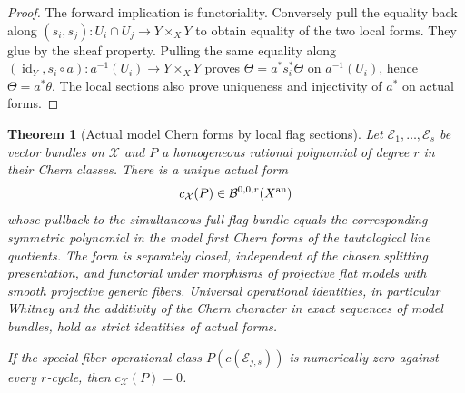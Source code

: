\documentclass[11pt]{article}
\newtheorem{theorem}{Theorem}[section]
\theoremstyle{definition}
\theoremstyle{remark}
\numberwithin{equation}{section}
\begin{document}
\begin{proof}
The forward implication is functoriality.  Conversely pull the equality
back along $(s_i,s_j):U_i\cap U_j\to Y\times_XY$ to obtain equality
of the two local forms.  They glue by the sheaf property.  Pulling the
same equality along
$(\operatorname{id}_Y,s_i\circ a):a^{-1}(U_i)\to Y\times_XY$ proves
$\Theta=a^*s_i^*\Theta$ on $a^{-1}(U_i)$, hence $\Theta=a^*\theta$.
The local sections also prove uniqueness and injectivity of $a^*$ on
actual forms.  
\end{proof}

\begin{theorem}[Actual model Chern forms by local flag sections]
\label{r10c:chern}
Let $\mathcal E_1,\ldots,\mathcal E_s$ be vector bundles on
$\mathcal X$ and $P$ a homogeneous rational polynomial of degree $r$
in their Chern classes.  There is a unique actual form
\[
              c_{\mathcal X}(P)\in\mathcal B^{0,0,r}(X^{\rm an})
\]
whose pullback to the simultaneous full flag bundle equals the
corresponding symmetric polynomial in the model first Chern forms of
the tautological line quotients.  The form is separately closed,
independent of the chosen splitting presentation, and functorial under
morphisms of projective flat models with smooth projective generic
fibers.  Universal operational identities, in particular Whitney and
the additivity of the Chern character in exact sequences of model
bundles, hold as strict identities of actual forms.

If the special-fiber operational class $P(c(\mathcal E_{j,s}))$ is
numerically zero against every $r$-cycle, then $c_{\mathcal X}(P)=0$.
\end{theorem}
\end{document}
